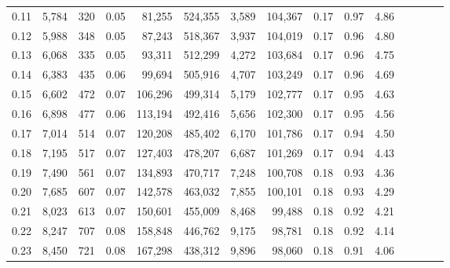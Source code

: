 \begin{tabular}{rrrcrrrrrrrrrrr}
0.11 &   5,784 &    320 &                                       0.05 &   81,255 &  524,355 &    3,589 &  104,367 &  0.17 &  0.97 &                         4.86 \\
0.12 &   5,988 &    348 &                                       0.05 &   87,243 &  518,367 &    3,937 &  104,019 &  0.17 &  0.96 &                         4.80 \\
0.13 &   6,068 &    335 &                                       0.05 &   93,311 &  512,299 &    4,272 &  103,684 &  0.17 &  0.96 &                         4.75 \\
0.14 &   6,383 &    435 &                                       0.06 &   99,694 &  505,916 &    4,707 &  103,249 &  0.17 &  0.96 &                         4.69 \\
0.15 &   6,602 &    472 &                                       0.07 &  106,296 &  499,314 &    5,179 &  102,777 &  0.17 &  0.95 &                         4.63 \\
0.16 &   6,898 &    477 &                                       0.06 &  113,194 &  492,416 &    5,656 &  102,300 &  0.17 &  0.95 &                         4.56 \\
0.17 &   7,014 &    514 &                                       0.07 &  120,208 &  485,402 &    6,170 &  101,786 &  0.17 &  0.94 &                         4.50 \\
0.18 &   7,195 &    517 &                                       0.07 &  127,403 &  478,207 &    6,687 &  101,269 &  0.17 &  0.94 &                         4.43 \\
0.19 &   7,490 &    561 &                                       0.07 &  134,893 &  470,717 &    7,248 &  100,708 &  0.18 &  0.93 &                         4.36 \\
0.20 &   7,685 &    607 &                                       0.07 &  142,578 &  463,032 &    7,855 &  100,101 &  0.18 &  0.93 &                         4.29 \\
0.21 &   8,023 &    613 &                                       0.07 &  150,601 &  455,009 &    8,468 &   99,488 &  0.18 &  0.92 &                         4.21 \\
0.22 &   8,247 &    707 &                                       0.08 &  158,848 &  446,762 &    9,175 &   98,781 &  0.18 &  0.92 &                         4.14 \\
0.23 &   8,450 &    721 &                                       0.08 &  167,298 &  438,312 &    9,896 &   98,060 &  0.18 &  0.91 &                         4.06 \\

\end{tabular}
